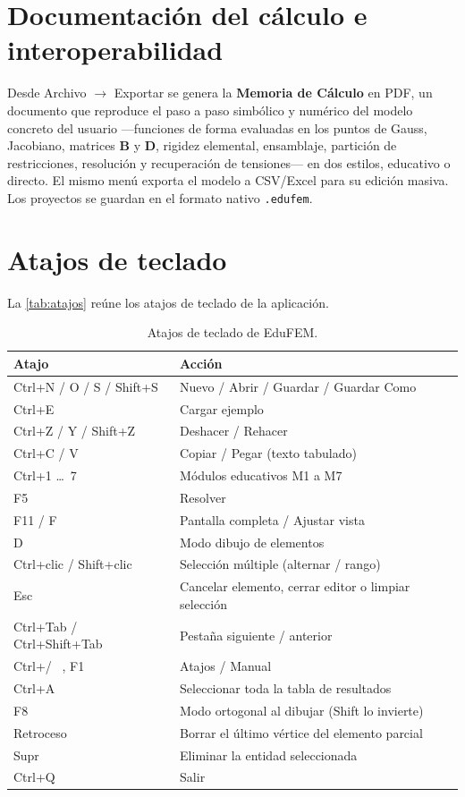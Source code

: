 \section{Documentación del cálculo e interoperabilidad}

Desde \textsf{Archivo} $\rightarrow$ \textsf{Exportar} se genera la \textbf{Memoria de Cálculo} en PDF, un documento que reproduce el paso a paso simbólico y numérico del modelo concreto del usuario ---funciones de forma evaluadas en los puntos de Gauss, Jacobiano, matrices $\bm{B}$ y $\bm{D}$, rigidez elemental, ensamblaje, partición de restricciones, resolución y recuperación de tensiones--- en dos estilos, educativo o directo. El mismo menú exporta el modelo a CSV/Excel para su edición masiva. Los proyectos se guardan en el formato nativo \texttt{.edufem}.

\section{Atajos de teclado}

La \autoref{tab:atajos} reúne los atajos de teclado de la aplicación.

\begin{table}[htbp]
\centering
\caption{Atajos de teclado de EduFEM.}
\label{tab:atajos}
\begin{tabular}{l l}
\hline
Atajo & Acción \\
\hline
Ctrl+N / O / S / Shift+S & Nuevo / Abrir / Guardar / Guardar Como \\
Ctrl+E                   & Cargar ejemplo \\
Ctrl+Z / Y / Shift+Z     & Deshacer / Rehacer \\
Ctrl+C / V               & Copiar / Pegar (texto tabulado) \\
Ctrl+1 \dots\ 7          & Módulos educativos M1 a M7 \\
F5                       & Resolver \\
F11 / F                  & Pantalla completa / Ajustar vista \\
D                        & Modo dibujo de elementos \\
Ctrl+clic / Shift+clic   & Selección múltiple (alternar / rango) \\
Esc                      & Cancelar elemento, cerrar editor o limpiar selección \\
Ctrl+Tab / Ctrl+Shift+Tab & Pestaña siguiente / anterior \\
Ctrl+/ \ , F1            & Atajos / Manual \\
Ctrl+A                   & Seleccionar toda la tabla de resultados \\
F8                       & Modo ortogonal al dibujar (Shift lo invierte) \\
Retroceso                & Borrar el último vértice del elemento parcial \\
Supr                     & Eliminar la entidad seleccionada \\
Ctrl+Q                   & Salir \\
\hline
\end{tabular}
\end{table}

